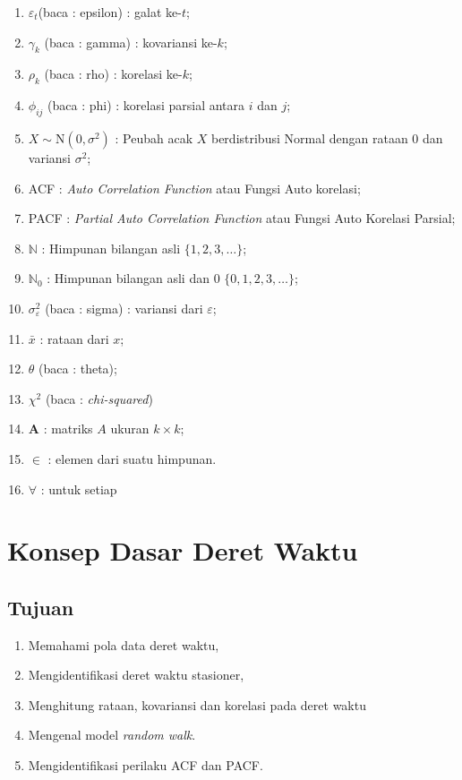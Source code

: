 \documentclass[
]{book}
\providecommand{\tightlist}{%
  \setlength{\itemsep}{0pt}\setlength{\parskip}{0pt}}
\begin{document}
\begin{enumerate}
\item $\varepsilon_t$(baca : epsilon) : galat ke-$t$;
\item $\gamma_k$ (baca : gamma) : kovariansi ke-$k$;
\item $\rho_k$ (baca : rho) : korelasi ke-$k$; 
\item $\phi_{ij}$ (baca : phi) : korelasi parsial antara $i$ dan $j$; 
\item $X \sim \text{N}(0,\sigma^2)$ : Peubah acak $X$ berdistribusi Normal dengan rataan 0 dan variansi $\sigma^2$;  
\item ACF : \textit{Auto Correlation Function} atau Fungsi Auto korelasi;  
\item PACF : \textit{Partial Auto Correlation Function} atau Fungsi Auto Korelasi Parsial;
\item $\mathbb{N}$ : Himpunan bilangan asli $\{1,2,3,\dots\}$;
\item $\mathbb{N}_0$ : Himpunan bilangan asli dan 0 $\{0,1,2,3,\dots\}$;
\item $\sigma^2_\varepsilon$ (baca : sigma) : variansi dari $\varepsilon$;
\item $\bar{x}$ : rataan dari $x$;
\item $\theta$ (baca : theta);
\item $\chi^2$ (baca : \textit{chi-squared})
\item $\mathbf{A}$ : matriks $A$ ukuran $k\times k$; 
\item $\in$ : elemen dari suatu himpunan.
\item $\forall$ : untuk setiap
\end{enumerate}

\hypertarget{konsep-dasar-deret-waktu}{%
\chapter{Konsep Dasar Deret Waktu}\label{konsep-dasar-deret-waktu}}

\hypertarget{tujuan}{%
\section{Tujuan}\label{tujuan}}

\begin{enumerate}
\def\labelenumi{\arabic{enumi}.}
\tightlist
\item
  Memahami pola data deret waktu,\\
\item
  Mengidentifikasi deret waktu stasioner,\\
\item
  Menghitung rataan, kovariansi dan korelasi pada deret waktu\\
\item
  Mengenal model \emph{random walk}.\\
\item
  Mengidentifikasi perilaku ACF dan PACF.
\end{enumerate}
\end{document}
